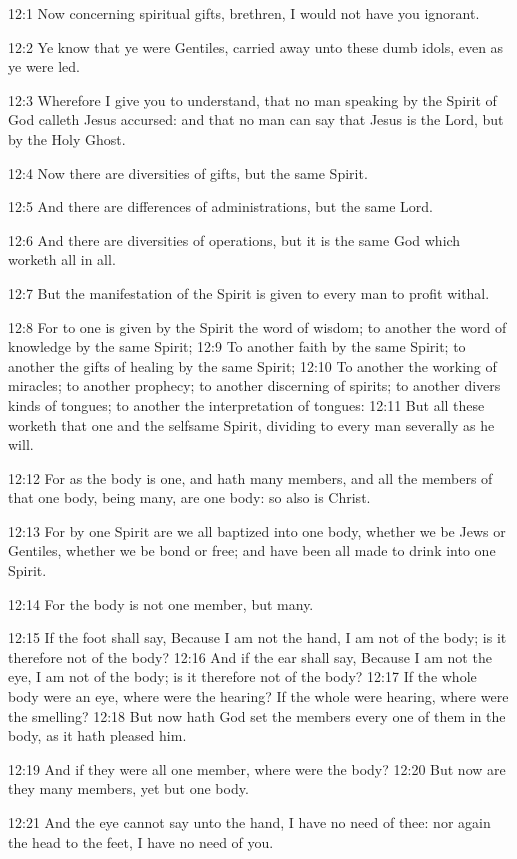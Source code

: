 12:1 Now concerning spiritual gifts, brethren, I would not have you ignorant.

12:2 Ye know that ye were Gentiles, carried away unto these dumb idols, even as ye were led.

12:3 Wherefore I give you to understand, that no man speaking by the Spirit of God calleth Jesus accursed: and that no man can say that Jesus is the Lord, but by the Holy Ghost.

12:4 Now there are diversities of gifts, but the same Spirit.

12:5 And there are differences of administrations, but the same Lord.

12:6 And there are diversities of operations, but it is the same God which worketh all in all.

12:7 But the manifestation of the Spirit is given to every man to profit withal.

12:8 For to one is given by the Spirit the word of wisdom; to another the word of knowledge by the same Spirit; 12:9 To another faith by the same Spirit; to another the gifts of healing by the same Spirit; 12:10 To another the working of miracles; to another prophecy; to another discerning of spirits; to another divers kinds of tongues; to another the interpretation of tongues: 12:11 But all these worketh that one and the selfsame Spirit, dividing to every man severally as he will.

12:12 For as the body is one, and hath many members, and all the members of that one body, being many, are one body: so also is Christ.

12:13 For by one Spirit are we all baptized into one body, whether we be Jews or Gentiles, whether we be bond or free; and have been all made to drink into one Spirit.

12:14 For the body is not one member, but many.

12:15 If the foot shall say, Because I am not the hand, I am not of the body; is it therefore not of the body?  12:16 And if the ear shall say, Because I am not the eye, I am not of the body; is it therefore not of the body?  12:17 If the whole body were an eye, where were the hearing? If the whole were hearing, where were the smelling?  12:18 But now hath God set the members every one of them in the body, as it hath pleased him.

12:19 And if they were all one member, where were the body?  12:20 But now are they many members, yet but one body.

12:21 And the eye cannot say unto the hand, I have no need of thee: nor again the head to the feet, I have no need of you.

